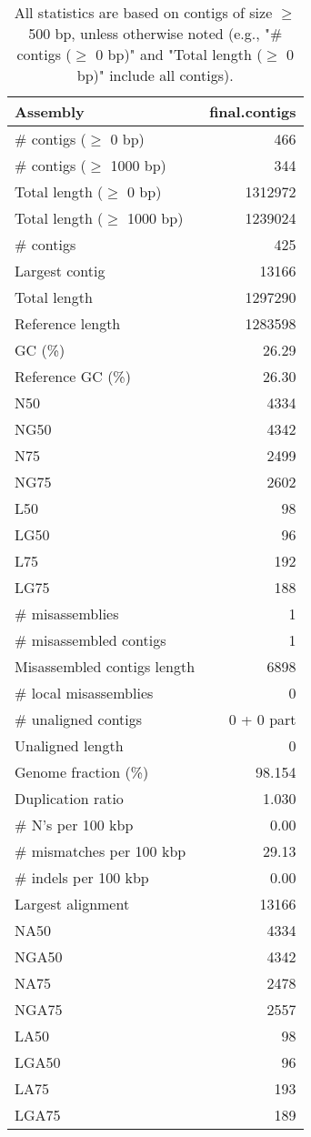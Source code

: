 \documentclass[12pt,a4paper]{article}
\begin{document}
\begin{table}[ht]
\begin{center}
\caption{All statistics are based on contigs of size $\geq$ 500 bp, unless otherwise noted (e.g., "\# contigs ($\geq$ 0 bp)" and "Total length ($\geq$ 0 bp)" include all contigs).}
\begin{tabular}{|l*{1}{|r}|}
\hline
Assembly & final.contigs \\ \hline
\# contigs ($\geq$ 0 bp) & 466 \\ \hline
\# contigs ($\geq$ 1000 bp) & 344 \\ \hline
Total length ($\geq$ 0 bp) & 1312972 \\ \hline
Total length ($\geq$ 1000 bp) & 1239024 \\ \hline
\# contigs & 425 \\ \hline
Largest contig & 13166 \\ \hline
Total length & 1297290 \\ \hline
Reference length & 1283598 \\ \hline
GC (\%) & 26.29 \\ \hline
Reference GC (\%) & 26.30 \\ \hline
N50 & 4334 \\ \hline
NG50 & 4342 \\ \hline
N75 & 2499 \\ \hline
NG75 & 2602 \\ \hline
L50 & 98 \\ \hline
LG50 & 96 \\ \hline
L75 & 192 \\ \hline
LG75 & 188 \\ \hline
\# misassemblies & 1 \\ \hline
\# misassembled contigs & 1 \\ \hline
Misassembled contigs length & 6898 \\ \hline
\# local misassemblies & 0 \\ \hline
\# unaligned contigs & 0 + 0 part \\ \hline
Unaligned length & 0 \\ \hline
Genome fraction (\%) & 98.154 \\ \hline
Duplication ratio & 1.030 \\ \hline
\# N's per 100 kbp & 0.00 \\ \hline
\# mismatches per 100 kbp & 29.13 \\ \hline
\# indels per 100 kbp & 0.00 \\ \hline
Largest alignment & 13166 \\ \hline
NA50 & 4334 \\ \hline
NGA50 & 4342 \\ \hline
NA75 & 2478 \\ \hline
NGA75 & 2557 \\ \hline
LA50 & 98 \\ \hline
LGA50 & 96 \\ \hline
LA75 & 193 \\ \hline
LGA75 & 189 \\ \hline
\end{tabular}
\end{center}
\end{table}
\end{document}
